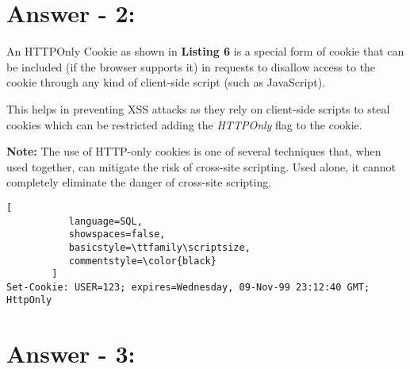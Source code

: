 \documentclass[10pt,a4paper,oneside]{article}
\begin{document}
\section*{Answer - 2:}

An HTTPOnly Cookie as shown in \textbf{Listing 6} is a special form of cookie that can be included (if the browser supports it) in requests to disallow access to the cookie through any kind of client-side script (such as JavaScript).
\par
This helps in preventing XSS attacks as they rely on client-side scripts to steal cookies which can be restricted adding the \textit{HTTPOnly} flag to the cookie.
\par
\textbf{Note:} The use of HTTP-only cookies is one of several techniques that, when used together, can mitigate the risk of cross-site scripting. Used alone, it cannot completely eliminate the danger of cross-site scripting.
\begin{lstlisting}[
           language=SQL,
           showspaces=false,
           basicstyle=\ttfamily\scriptsize,
           commentstyle=\color{black}
        ]
Set-Cookie: USER=123; expires=Wednesday, 09-Nov-99 23:12:40 GMT; HttpOnly
\end{lstlisting}

\section*{Answer - 3:}
\end{document}
